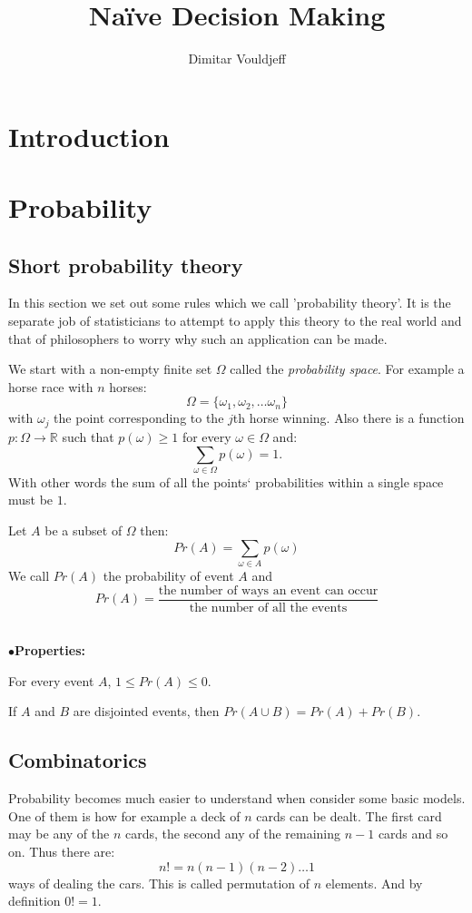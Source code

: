 \documentclass[12pt, a4paper,leqno]{report}
\title{Naïve Decision Making}
\author{Dimitar Vouldjeff}
\theoremstyle{normal}
\theoremstyle{normal}
\begin{document}
	\maketitle
	\tableofcontents
	
	\chapter{Introduction}
	
	\chapter{Probability}
	\section{Short probability theory}
	In this section we set out some rules which we call 'probability theory'. It is the separate job of statisticians to attempt to apply this theory to the real world and that of philosophers to worry why such an application can be made.
	
	We start with a non-empty finite set $\Omega$ called the \textit{probability space}. For example a horse race with $n$ horses:
	\[ \Omega = \lbrace \omega_1, \omega_2, \dots\omega_n \rbrace \]
	with $\omega_j$ the point corresponding to the $j$th horse winning.
	Also there is a function $p : \Omega \rightarrow \mathbb{R}$ such that $p(\omega)\geq 1$ for every $\omega\in\Omega$ and:
	\[ \sum\limits_{\omega\in\Omega} p(\omega) = 1. \]
	With other words the sum of all the points` probabilities within a single space must be $1$.
	
	Let $A$ be a subset of $\Omega$ then:
	\[ Pr(A) = \sum\limits_{\omega\in A} p(\omega) \]
	We call $Pr(A)$ the probability of event $A$ and 
	\[ Pr(A) = \frac{\text{the number of ways an event can occur}}{\text{the number of all the events}} \]\\
	\begin{list}{$\bullet$}{\textbf{Properties:}}
		\item For every event $A$, $1 \leq Pr(A) \leq 0$.
		\item If $A$ and $B$ are disjointed events, then $Pr(A\cup B) = Pr(A) + Pr(B)$.
	\end{list}
	
	\section{Combinatorics}
	Probability becomes much easier to understand when consider some basic models.
	One of them is how for example a deck of $n$ cards can be dealt. The first card may be any of the $n$ cards, the second any of the remaining $n - 1$ cards and so on. Thus there are:
	\[ n! = n(n - 1)(n - 2)\dots 1 \]
	ways of dealing the cars. This is called permutation of $n$ elements. And by definition $0! = 1$.\\
	
\end{document}
